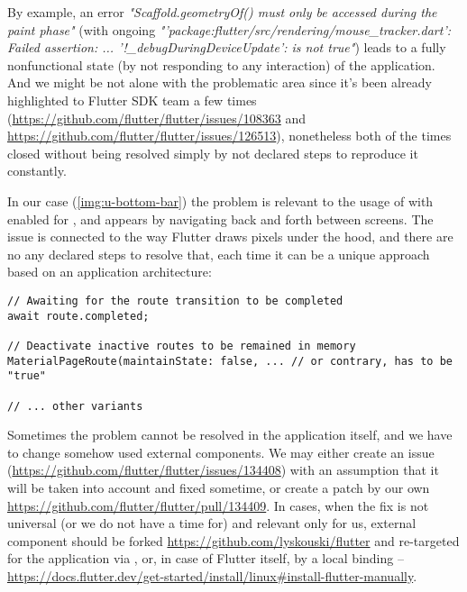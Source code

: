 By example, an error \emph{"Scaffold.geometryOf() must only be accessed during the paint phase"} (with ongoing 
\emph{"'package:flutter/src/rendering/mouse\_tracker.dart': Failed assertion: ... '!\_debugDuringDeviceUpdate': 
is not true"}) leads to a fully nonfunctional state (by not responding to any interaction) of the application. And we 
might be not alone with the problematic area since it's been already highlighted to Flutter SDK team a few times
(\href{https://github.com/flutter/flutter/issues/108363}{https://github.com/flutter/flutter/issues/108363} and
\href{https://github.com/flutter/flutter/issues/126513}{https://github.com/flutter/flutter/issues/126513}), nonetheless
both of the times closed without being resolved simply by not declared steps to reproduce it constantly.


In our case (\cref{img:u-bottom-bar}) the problem is relevant to the usage of  with enabled  for , and appears by 
navigating back and forth between screens. The issue is connected to the way Flutter draws pixels under the hood, and 
there are no any declared steps to resolve that, each time it can be a unique approach based on an application 
architecture:

\begin{lstlisting}
// Awaiting for the route transition to be completed
await route.completed;

// Deactivate inactive routes to be remained in memory
MaterialPageRoute(maintainState: false, ... // or contrary, has to be "true"

// ... other variants
\end{lstlisting}

Sometimes the problem cannot be resolved in the application itself, and we have to change somehow used external 
components. We may either create an issue 
(\href{https://github.com/flutter/flutter/issues/134408}{https://github.com/flutter/flutter/issues/134408}) 
with an assumption that it will be taken into account and fixed sometime, or create a patch by our own 
\href{https://github.com/flutter/flutter/pull/134409}{https://github.com/flutter/flutter/pull/134409}. In cases, when 
the fix is not universal (or we do not have a time for) and relevant only for us, external component should be forked 
\href{https://github.com/lyskouski/flutter}{https://github.com/lyskouski/flutter} and re-targeted for the application
via , or, in case of Flutter itself, by a local binding -- 
\href{https://docs.flutter.dev/get-started/install/linux#install-flutter-manually}{https://docs.flutter.dev/get-started/install/linux\#install-flutter-manually}.
